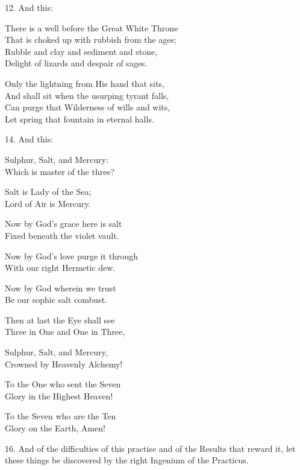 12. And this:
\begin{tightverse}
 There is a well before the Great White Throne \\
That is choked up with rubbish from the ages; \\
Rubble and clay and sediment and stone, \\
Delight of lizards and despair of sages.

Only the lightning from His hand that sits, \\
And shall sit when the usurping tyrant falls, \\
Can purge that Wilderness of wills and wits, \\
Let spring that fountain in eternal halls. \\
\end{tightverse}

14. And this:
\begin{tightverse}
 Sulphur, Salt, and Mercury: \\
 Which is master of the three?

 Salt is Lady of the Sea; \\
 Lord of Air is Mercury.

 Now by God’s grace here is salt \\
 Fixed beneath the violet vault.

 Now by God’s love purge it through \\
 With our right Hermetic dew.

 Now by God wherein we trust \\
 Be our sophic salt combust.

 Then at last the Eye shall see \\
 Three in One and One in Three,

 Sulphur, Salt, and Mercury, \\
 Crowned by Heavenly Alchemy!

 To the One who sent the Seven \\
 Glory in the Highest Heaven!

 To the Seven who are the Ten \\
 Glory on the Earth, Amen!
\end{tightverse}

16. And of the difficulties of this practise and of the Results that reward it, let these things be discovered by the right Ingenium of the Practicus.

